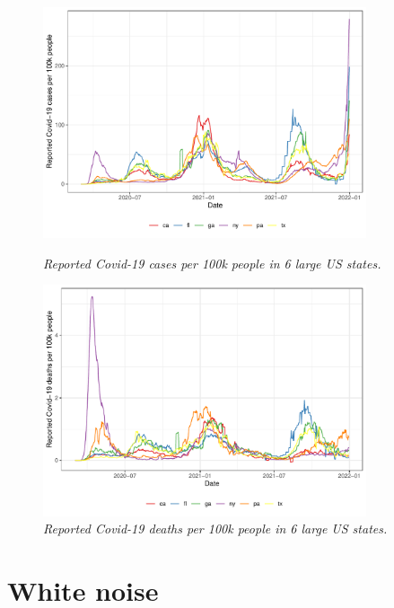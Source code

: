 \documentclass{article}
\begin{document}
\begin{figure}[p]
\centering
\includegraphics[width=0.85\textwidth]{fig/covid-1.pdf}
\caption{\it Reported Covid-19 cases per 100k people in 6 large US states.}
\label{fig:covid-cases}

\bigskip\bigskip
\includegraphics[width=0.85\textwidth]{fig/covid-2.pdf}
\caption{\it Reported Covid-19 deaths per 100k people in 6 large US states.}
\label{fig:covid-deaths}
\end{figure}

\section{White noise}
\def\wn{\mathrm{wn}}
\end{document}
